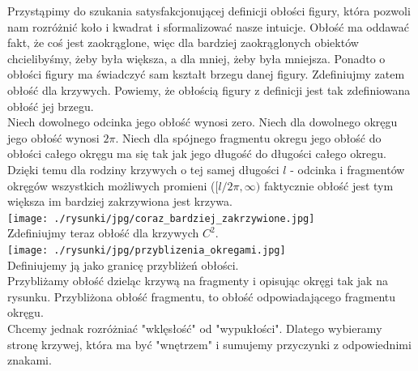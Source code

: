 \documentclass[a4paper, 12pt]{article}
\newcommand{\rysunek}[1]{\hfill \break\\[16pt] \Huge \textbf{\textcolor{violet}{Brakujący rysunek \normalsize
#1}} \hfill
\break \\[16pt] \normalsize}
\begin{document}
Przystąpimy do szukania satysfakcjonującej definicji obłości figury, która pozwoli nam rozróżnić
koło i kwadrat i sformalizować nasze intuicje. Obłość ma oddawać fakt, że coś jest zaokrąglone, więc dla bardziej
zaokrąglonych obiektów chcielibyśmy, żeby była większa, a dla mniej, żeby była mniejsza. Ponadto o obłości
figury ma świadczyć sam kształt brzegu danej figury. Zdefiniujmy zatem obłość dla krzywych. Powiemy, że
obłością figury z definicji jest tak zdefiniowana obłość jej brzegu. \\
Niech dowolnego odcinka jego obłość wynosi zero. Niech dla dowolnego okręgu jego obłość wynosi $2\pi$.
Niech dla spójnego fragmentu okregu jego obłość do obłości całego okręgu ma się tak jak jego długość do
długości całego okregu. Dzięki temu dla rodziny krzywych o tej samej długości $l$ - odcinka i fragmentów
okręgów wszystkich możliwych promieni ($[l/2\pi, \infty)$ faktycznie obłość jest tym większa im bardziej
zakrzywiona jest krzywa. \\
\texttt{[image: ./rysunki/jpg/coraz\_bardziej\_zakrzywione.jpg]} \\
Zdefiniujmy teraz obłość dla krzywych $C^2$. \\
\texttt{[image: ./rysunki/jpg/przyblizenia\_okregami.jpg]} \\
Definiujemy ją jako granicę przybliżeń obłości. \\
Przybliżamy obłość dzieląc krzywą na fragmenty i opisując okręgi tak jak na rysunku. Przybliżona obłość
fragmentu, to obłość odpowiadającego fragmentu okręgu. \\
Chcemy jednak rozróżniać "wklęsłość" od "wypukłości". Dlatego wybieramy stronę krzywej, która ma być
"wnętrzem" i sumujemy przyczynki z odpowiednimi znakami. \\
\end{document}
